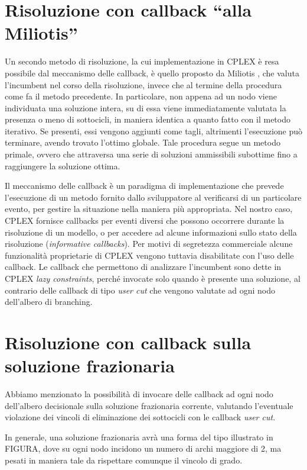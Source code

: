 \section{Risoluzione con callback ``alla Miliotis''}
Un secondo metodo di risoluzione, la cui implementazione in CPLEX è resa possibile dal meccanismo delle callback, è quello proposto da Miliotis \citep{miliotis1978using}, che valuta l'incumbent nel corso della risoluzione, invece che al termine della procedura come fa il metodo precedente. In particolare, non appena ad un nodo viene individuata una soluzione intera, su di essa viene immediatamente valutata la presenza o meno di sottocicli, in maniera identica a quanto fatto con il metodo iterativo. Se presenti, essi vengono aggiunti come tagli, altrimenti l'esecuzione può terminare, avendo trovato l'ottimo globale. Tale procedura segue un metodo primale, ovvero che attraversa una serie di soluzioni ammissibili subottime fino a raggiungere la soluzione ottima.

Il meccanismo delle callback è un paradigma di implementazione che prevede l'esecuzione di un metodo fornito dallo sviluppatore al verificarsi di un particolare evento, per gestire la situazione nella maniera più appropriata. Nel nostro caso, CPLEX fornisce callbacks per eventi diversi che possono occorrere durante la risoluzione di un modello, o per accedere ad alcune informazioni sullo stato della risoluzione (\textit{informative callbacks}). Per motivi di segretezza commerciale alcune funzionalità proprietarie di CPLEX vengono tuttavia disabilitate con l'uso delle callback. Le callback che permettono di analizzare l'incumbent sono dette in CPLEX \textit{lazy constraints}, perché invocate solo quando è presente una soluzione, al contrario delle callback di tipo \textit{user cut} che vengono valutate ad ogni nodo dell'albero di branching.

\section{Risoluzione con callback sulla soluzione frazionaria}
Abbiamo menzionato la possibilità di invocare delle callback ad ogni nodo dell'albero decisionale sulla soluzione frazionaria corrente, valutando l'eventuale violazione dei vincoli di eliminazione dei sottocicli con le callback \textit{user cut}.

In generale, una soluzione frazionaria avrà una forma del tipo illustrato in FIGURA, dove su ogni nodo incidono un numero di archi maggiore di 2, ma pesati in maniera tale da rispettare comunque il vincolo di grado.


